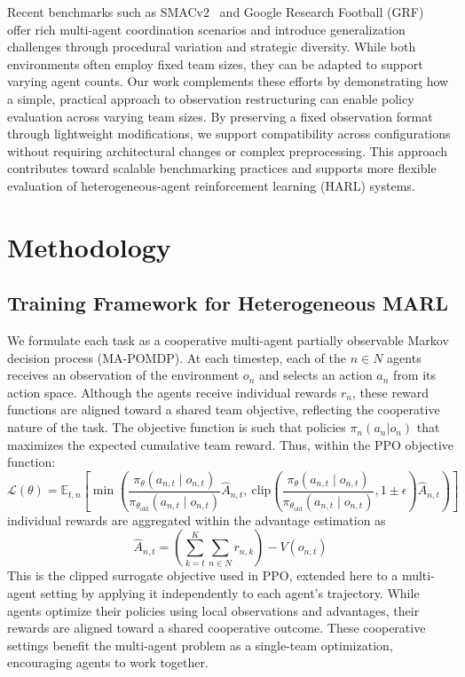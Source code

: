 \documentclass{article}
\begin{document}
Recent benchmarks such as SMACv2~\cite{ellis2023} and Google Research Football 
(GRF)~\cite{kurach2020} offer rich multi-agent coordination scenarios and introduce 
generalization challenges through procedural variation and strategic diversity. While both 
environments often employ fixed team sizes, they can be adapted to support varying agent counts.
Our work complements these efforts by demonstrating how a simple, practical approach to 
observation restructuring can enable policy evaluation across varying team sizes. By 
preserving a fixed observation format through lightweight modifications, we support compatibility 
across configurations without requiring architectural changes or complex preprocessing.
This approach contributes toward scalable benchmarking practices and supports 
more flexible evaluation of heterogeneous-agent reinforcement learning (HARL) systems.


\section{Methodology}\label{sec:methodology}

\subsection{Training Framework for Heterogeneous MARL}
\label{subsec:training_framework}

We formulate each task as a cooperative multi-agent partially observable Markov 
decision process (MA-POMDP). At each timestep, each of the $n\in N$ agents receives 
an observation of the environment $o_n$ and selects an action $a_n$ from its action space. 
Although the agents receive individual rewards $r_n$, these reward functions are aligned 
toward a shared team objective, reflecting the cooperative nature of the task.
The objective function is such that policies \(\pi_n(a_n|o_n)\)
that maximizes the expected cumulative team reward. Thus, within the PPO objective function:
\[
    \mathcal{L}(\theta) = \mathbb{E}_{t,n} \left[ 
    \min \left( 
    \frac{\pi_\theta(a_{n,t} \mid o_{n,t})}{\pi_{\theta_{\text{old}}}(a_{n,t} \mid o_{n,t})} 
        \hat{A}_{n,t},\ 
    \text{clip}\left( 
    \frac{\pi_\theta(a_{n,t} \mid o_{n,t})}{\pi_{\theta_{\text{old}}}(a_{n,t} \mid o_{n,t})}, 
    1 \pm \epsilon
    \right) \hat{A}_{n,t}
    \right) 
    \right]
\]
individual rewards are aggregated within the advantage estimation as
\[
    \hat{A}_{n,t} = \left( \sum_{k=t}^{K} \sum_{n\in N} r_{n,k} \right) - V(o_{n,t})
\]
This is the clipped surrogate objective used in PPO, extended here to a multi-agent setting by 
applying it independently to each agent's trajectory. While agents optimize their policies using
local observations and advantages, their rewards are aligned toward a shared cooperative outcome.
These cooperative settings benefit the multi-agent problem as a single-team optimization, 
encouraging agents to work together. 
\end{document}
